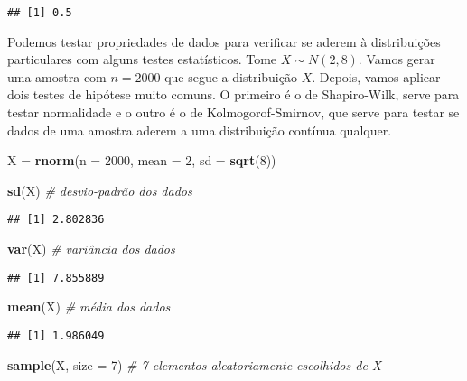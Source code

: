 \documentclass[]{article}
\newenvironment{Shaded}{\begin{snugshade}}{\end{snugshade}}
\newcommand{\KeywordTok}[1]{\textcolor[rgb]{0.13,0.29,0.53}{\textbf{#1}}}
\newcommand{\DataTypeTok}[1]{\textcolor[rgb]{0.13,0.29,0.53}{#1}}
\newcommand{\DecValTok}[1]{\textcolor[rgb]{0.00,0.00,0.81}{#1}}
\newcommand{\StringTok}[1]{\textcolor[rgb]{0.31,0.60,0.02}{#1}}
\newcommand{\CommentTok}[1]{\textcolor[rgb]{0.56,0.35,0.01}{\textit{#1}}}
\newcommand{\NormalTok}[1]{#1}
\begin{document}
\begin{verbatim}
## [1] 0.5
\end{verbatim}

Podemos testar propriedades de dados para verificar se aderem à
distribuições particulares com alguns testes estatísticos. Tome
\(X \sim N(2, 8)\). Vamos gerar uma amostra com \(n = 2000\) que segue a
distribuição \(X\). Depois, vamos aplicar dois testes de hipótese muito
comuns. O primeiro é o de Shapiro-Wilk, serve para testar normalidade e
o outro é o de Kolmogorof-Smirnov, que serve para testar se dados de uma
amostra aderem a uma distribuição contínua qualquer.

\begin{Shaded}
\begin{Highlighting}[]
\NormalTok{X =}\StringTok{ }\KeywordTok{rnorm}\NormalTok{(}\DataTypeTok{n =} \DecValTok{2000}\NormalTok{,}
          \DataTypeTok{mean =} \DecValTok{2}\NormalTok{,}
          \DataTypeTok{sd =} \KeywordTok{sqrt}\NormalTok{(}\DecValTok{8}\NormalTok{))}

\KeywordTok{sd}\NormalTok{(X) }\CommentTok{# desvio-padrão dos dados}
\end{Highlighting}
\end{Shaded}

\begin{verbatim}
## [1] 2.802836
\end{verbatim}

\begin{Shaded}
\begin{Highlighting}[]
\KeywordTok{var}\NormalTok{(X) }\CommentTok{# variância dos dados}
\end{Highlighting}
\end{Shaded}

\begin{verbatim}
## [1] 7.855889
\end{verbatim}

\begin{Shaded}
\begin{Highlighting}[]
\KeywordTok{mean}\NormalTok{(X) }\CommentTok{# média dos dados}
\end{Highlighting}
\end{Shaded}

\begin{verbatim}
## [1] 1.986049
\end{verbatim}

\begin{Shaded}
\begin{Highlighting}[]
\KeywordTok{sample}\NormalTok{(X, }\DataTypeTok{size =} \DecValTok{7}\NormalTok{) }\CommentTok{# 7 elementos aleatoriamente escolhidos de X}
\end{Highlighting}
\end{Shaded}
\end{document}
